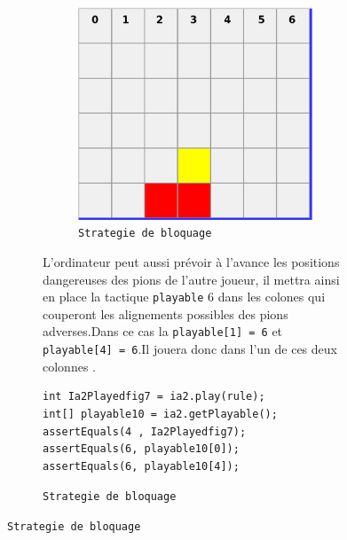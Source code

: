 \begin{figure}[H]
\begin{figure}[H]
\begin{figure}[H]
\begin{center}
  \includegraphics[scale=0.2]{playable1}
  \caption{\texttt{Strategie de bloquage}}
\end{center}
\end{figure}
L'ordinateur peut aussi prévoir à l'avance les positions dangereuses des pions de l'autre joueur,
il mettra ainsi en place la tactique \texttt{playable} 6 dans les colones qui couperont les alignements 
possibles des pions adverses.Dans ce cas la \texttt{playable[1] = 6} et \texttt{playable[4] = 6}.Il jouera donc dans
l'un de ces deux colonnes .

\begin{verbatim}
int Ia2Playedfig7 = ia2.play(rule);
int[] playable10 = ia2.getPlayable();
assertEquals(4 , Ia2Playedfig7);
assertEquals(6, playable10[0]);
assertEquals(6, playable10[4]);
\end{verbatim}



\end{figure}
\end{figure}
